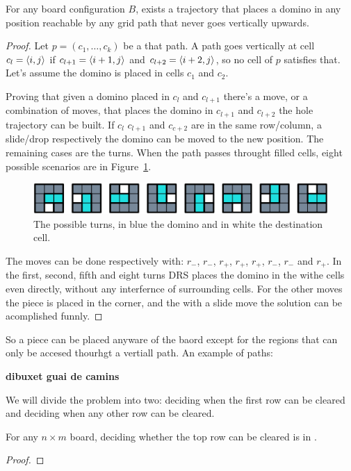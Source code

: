 \begin{lemma0}
For any board configuration $B$, exists a trajectory that places a domino in any position reachable by any grid path that never goes vertically upwards.
\end{lemma0}
\begin{proof}
    Let $p = ( c_1,\dots ,c_k )$ be a that path. A path goes vertically at cell $c_l = \cell$ if $c_{l+1} = \cell[i+1][j]$ and $c_{l+2} = \cell[i+2][j]$, so no cell of $p$ satisfies that. Let's assume the domino is placed in cells $c_1$ and $c_2$. 


    Proving that given a domino placed in $c_l$ and $c_{l+1}$ there's a move, or a combination of moves, that places the domino in $c_{l+1}$ and $c_{l+2}$ the hole trajectory can be built. If $c_l$ $c_{l+1}$ and $c_{c+2}$ are in the same row/column, a slide/drop respectively the domino can be moved to the new position. The remaining cases are the turns. When the path passes throught filled cells, eight possible scenarios are in Figure~\ref{dom:turns}.

\begin{figure}[h]
    \centering
    \includegraphics[width=\textwidth]{./pictures/dominoes/turns.pdf}
    \caption{The possible turns, in blue the domino and in white the destination cell.} 
    \label{dom:turns} 
\end{figure}

  The moves can be done respectively with: $r_-$, $r_-$, $r_+$, $r_+$, $r_+$, $r_-$, $r_-$ and $r_+$. In the first, second, fifth and eight turns DRS places the domino in the withe cells even directly, without any interfernce of surrounding cells. For the other moves the piece is placed in the corner, and the with a slide move the solution can be acomplished funnly.
\end{proof}


So a piece can be placed anyware of the baord except for the regions that can only be accesed thourhgt a vertiall path. An example of paths:

\textbf{dibuxet guai de camins}

We will divide the problem into two: deciding when the first row can be cleared and deciding when any other row can be cleared.


\begin{lemma0}
For any $n \times m$ board, deciding whether the top row can be cleared is in \pp.
\end{lemma0}
\begin{proof}
\end{proof}

